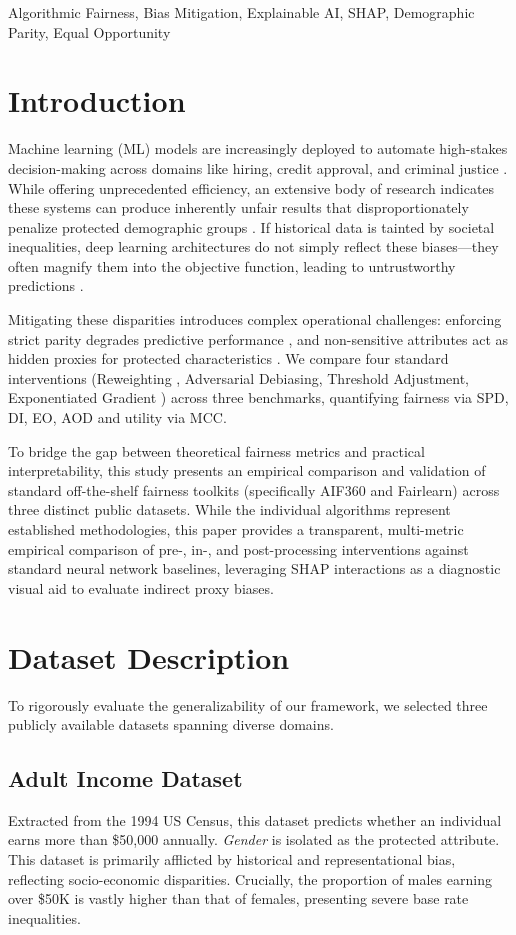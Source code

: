 \documentclass[conference]{IEEEtran}
\begin{document}
\begin{IEEEkeywords}
Algorithmic Fairness, Bias Mitigation, Explainable AI, SHAP, Demographic Parity, Equal Opportunity
\end{IEEEkeywords}

\section{Introduction}
Machine learning (ML) models are increasingly deployed to automate high-stakes decision-making across domains like hiring, credit approval, and criminal justice \cite{R1, R4}. While offering unprecedented efficiency, an extensive body of research indicates these systems can produce inherently unfair results that disproportionately penalize protected demographic groups \cite{R20}. If historical data is tainted by societal inequalities, deep learning architectures do not simply reflect these biases—they often magnify them into the objective function, leading to untrustworthy predictions \cite{R7, R9, R12}.

Mitigating these disparities introduces complex operational challenges: enforcing strict parity degrades predictive performance \cite{R22, R23}, and non-sensitive attributes act as hidden proxies for protected characteristics \cite{R17}. We compare four standard interventions (Reweighting \cite{R12}, Adversarial Debiasing, Threshold Adjustment, Exponentiated Gradient \cite{R10}) across three benchmarks, quantifying fairness via SPD, DI, EO, AOD and utility via MCC.

To bridge the gap between theoretical fairness metrics and practical interpretability, this study presents an empirical comparison and validation of standard off-the-shelf fairness toolkits (specifically AIF360 and Fairlearn) across three distinct public datasets. While the individual algorithms represent established methodologies, this paper provides a transparent, multi-metric empirical comparison of pre-, in-, and post-processing interventions against standard neural network baselines, leveraging SHAP interactions as a diagnostic visual aid to evaluate indirect proxy biases.

\section{Dataset Description}
To rigorously evaluate the generalizability of our framework, we selected three publicly available datasets spanning diverse domains.

\subsection{Adult Income Dataset}
Extracted from the 1994 US Census, this dataset predicts whether an individual earns more than \$50,000 annually. \textit{Gender} is isolated as the protected attribute. This dataset is primarily afflicted by historical and representational bias, reflecting socio-economic disparities. Crucially, the proportion of males earning over \$50K is vastly higher than that of females, presenting severe base rate inequalities.
\end{document}
